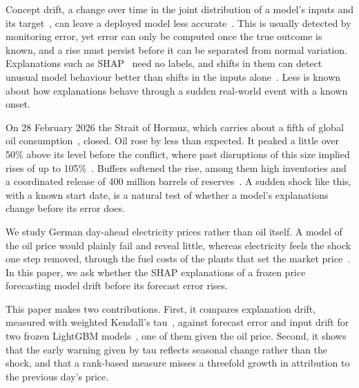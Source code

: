 Concept drift, a change over time in the joint distribution of a model's inputs and its target~\cite{gama2014}, can leave a deployed model less accurate~\cite{mougan2025}. This is usually detected by monitoring error, yet error can only be computed once the true outcome is known, and a rise must persist before it can be separated from normal variation. Explanations such as SHAP~\cite{lundberg2017} need no labels, and shifts in them can detect unusual model behaviour better than shifts in the inputs alone~\cite{mougan2025}. Less is known about how explanations behave through a sudden real-world event with a known onset.

On 28 February 2026 the Strait of Hormuz, which carries about a fifth of global oil consumption~\cite{eia2025}, closed. Oil rose by less than expected. It peaked a little over 50\% above its level before the conflict, where past disruptions of this size implied rises of up to 105\%~\cite{ecb2026}. Buffers softened the rise, among them high inventories and a coordinated release of 400 million barrels of reserves~\cite{ecb2026}. A sudden shock like this, with a known start date, is a natural test of whether a model's explanations change before its error does.

We study German day-ahead electricity prices rather than oil itself. A model of the oil price would plainly fail and reveal little, whereas electricity feels the shock one step removed, through the fuel costs of the plants that set the market price~\cite{trebbien2023}. In this paper, we ask whether the SHAP explanations of a frozen price forecasting model drift before its forecast error rises.

This paper makes two contributions. First, it compares explanation drift, measured with weighted Kendall's tau~\cite{vigna2015}, against forecast error and input drift for two frozen LightGBM models~\cite{ke2017}, one of them given the oil price. Second, it shows that the early warning given by tau reflects seasonal change rather than the shock, and that a rank-based measure misses a threefold growth in attribution to the previous day's price.